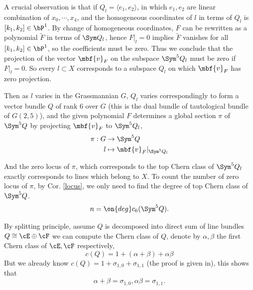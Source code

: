 \documentclass[a4paper, twoside]{article}
\begin{document}
A crucial observation is that if $Q_l=\langle e_1,e_2\rangle$, in which $e_1, e_2$ are linear combination of $x_0,\cdots,x_4$, and the homogeneous coordinates of $l$ in terms of $Q_l$ is $[k_1,k_2]\in\bP^1$. By change of homogeneous coordinates, $F$ can be rewritten as a polynomial $\tilde{F}$ in terms of $\Sym Q_l$, hence $F|_l=0$ implies $\tilde{F}$ vanishes for all $[k_1,k_2]\in\bP^1$, so the coefficients must be zero. Thus we conclude that the projection of the vector $\mbf{v}_F$ on the subspace $\Sym^5Q_l$ must be zero if $F|_l=0$. So every $l\subset X$ corresponds to a subspace $Q_l$ on which $\mbf{v}_F$ has zero projection.

Then as $l$ varies in the Grassmannian $G$, $Q_l$ varies correspondingly to form a vector bundle $Q$ of rank $6$ over $G$ (this is the dual bundle of tautological bundle of $G(2,5)$), and the given polynomial $F$ determines a global section $\pi$ of $\Sym^5Q$ by projecting $\mbf{v}_F$ to $\Sym^5Q_l$,
\begin{align*}
	\pi:G&\rightarrow\Sym^5Q\\
	l&\mapsto\mbf{v}_F|_{\Sym^5Q_l}
\end{align*}

And the zero locus of $\pi$, which corresponds to the top Chern class of $\Sym^5Q_l$ exactly corresponds to lines which belong to $X$. To count the number of zero locus of $\pi$, by Cor. \ref{locus}, we only need to find the degree of top Chern class of $\Sym^5Q$.
$$
n=\on{deg}c_6(\Sym^5Q).
$$
 
By splitting principle, assume $Q$ is decomposed into direct sum of line bundles $Q\cong\cE\oplus\cF$ we can compute the Chern class of $Q$, denote by $\alpha,\beta$ the first Chern class of $\cE,\cF$ respectively,
$$
c(Q)=1+(\alpha+\beta)+\alpha\beta
$$
But we already know $c(Q)=1+\sigma_{1,0}+\sigma_{1,1}$ (the proof is given in\cite{GH1994}), this shows that
$$
\alpha+\beta=\sigma_{1,0}, \alpha\beta=\sigma_{1,1}.
$$
\end{document}
